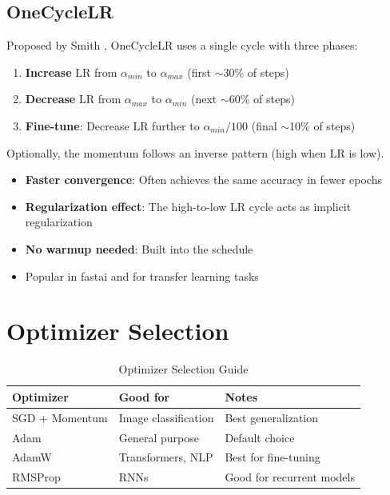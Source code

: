 \subsection{OneCycleLR}

Proposed by Smith \cite{smith2018disciplined}, OneCycleLR uses a single cycle with three phases:
\begin{enumerate}
    \item \textbf{Increase} LR from $\alpha_{min}$ to $\alpha_{max}$ (first $\sim$30\% of steps)
    \item \textbf{Decrease} LR from $\alpha_{max}$ to $\alpha_{min}$ (next $\sim$60\% of steps)
    \item \textbf{Fine-tune}: Decrease LR further to $\alpha_{min}/100$ (final $\sim$10\% of steps)
\end{enumerate}
Optionally, the momentum follows an inverse pattern (high when LR is low).

\begin{properties}
\begin{itemize}
    \item \textbf{Faster convergence}: Often achieves the same accuracy in fewer epochs
    \item \textbf{Regularization effect}: The high-to-low LR cycle acts as implicit regularization
    \item \textbf{No warmup needed}: Built into the schedule
    \item Popular in fastai and for transfer learning tasks
\end{itemize}
\end{properties}

\section{Optimizer Selection}

\begin{table}[ht]
    \centering
    \caption{Optimizer Selection Guide}
    \begin{tabular}{L{2.5cm} L{3cm} L{3.5cm}}
        \toprule
        \textbf{Optimizer} & \textbf{Good for} & \textbf{Notes} \\
        \midrule
        SGD + Momentum & Image classification & Best generalization \\
        Adam & General purpose & Default choice \\
        AdamW & Transformers, NLP & Best for fine-tuning \\
        RMSProp & RNNs & Good for recurrent models \\
        \bottomrule
    \end{tabular}
\end{table}

